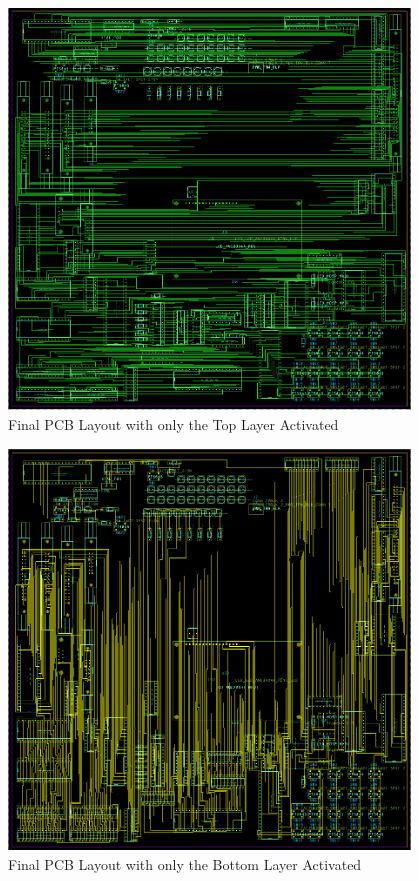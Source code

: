         \begin{figure}[ht]
            \begin{center}
                \includegraphics[width=0.95\textwidth]{figures/top.png}
                \caption{Final PCB Layout with only the Top Layer Activated} \label{fig:top}
            \end{center}
        \end{figure}

        \begin{figure}[ht]
            \begin{center}
                \includegraphics[width=0.95\textwidth]{figures/bottom.png}
                \caption{Final PCB Layout with only the Bottom Layer Activated} \label{fig:bottom}
            \end{center}
        \end{figure}

